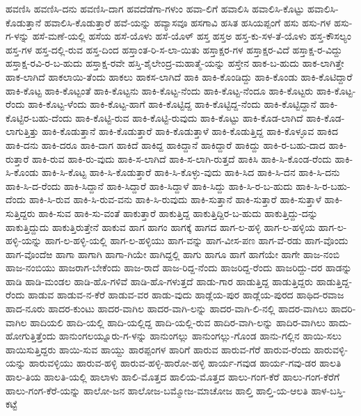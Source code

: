 ಹವಣಿಸಿ
ಹವಣಿಸಿ-ದನು
ಹವಣಿಸಿ-ದಾಗ
ಹವದೆಡೆಗಾ-ಗಳುಂ
ಹವಾ-ಲಿಗೆ
ಹವಾಲಿಸಿ
ಹವಾಲಿಸಿ-ಕೊಟ್ಟು
ಹವಾಲಿಸಿ-ಕೊಡುತ್ತಾನೆ
ಹವಾಲಿಸಿ-ಕೊಡುತ್ತಾರೆ
ಹವೆ-ಯನ್ನು
ಹವ್ಯಾಸವೂ
ಹಸಗಾವಿ
ಹಸಿತ
ಹಸಿಯಪ್ಪಂಗೆ
ಹಸು
ಹಸು-ಗಳ
ಹಸು-ಗ-ಳನ್ನು
ಹಸೆ-ಮಣೆ-ಯಲ್ಲಿ
ಹಸೆಯ
ಹಸೆ-ಯೊಳು
ಹಸೆ-ಯೊಳ್
ಹಸ್ತ
ಹಸ್ತಅ
ಹಸ್ತ-ಕು-ಸಳ-ತೆ-ಯೊಳು
ಹಸ್ತ-ಕೌಸಲ್ಯಂ
ಹಸ್ತ-ಗಳ
ಹಸ್ತ-ದಲ್ಲಿ-ರುವ
ಹಸ್ತ-ದಿಂದ
ಹಸ್ತಾಂತ-ರಿ-ಸ-ಲಾ-ಯಿತು
ಹಸ್ತಾಕ್ಷರ-ಗಳ
ಹಸ್ತಾಕ್ಷರ-ವಿದೆ
ಹಸ್ತಾಕ್ಷ-ರ-ವಿದ್ದು
ಹಸ್ತಾಕ್ಷ-ರವಿ-ರ-ಬ-ಹುದು
ಹಸ್ತಾಕ್ಷ-ರವೇ
ಹಸ್ತಿ-ಶೈಲೇಂದ್ರ-ಮಹಾತ್ಮೆ-ಯನ್ನು
ಹಸ್ತೇನ
ಹಾಕ-ಬ-ಹುದು
ಹಾಕ-ಲಾಗಿತ್ತೇ
ಹಾಕ-ಲಾಗಿದೆ
ಹಾಕಲಾಯಿ-ತೆಂದು
ಹಾಕಲು
ಹಾಕಸ-ಲಾಗಿದೆ
ಹಾಕಿ
ಹಾಕಿ-ಕೊಂಡಿದ್ದು
ಹಾಕಿ-ಕೊಂಡು
ಹಾಕಿ-ಕೊಟಿದ್ದಾರೆ
ಹಾಕಿ-ಕೊಟ್ಟ
ಹಾಕಿ-ಕೊಟ್ಟಂತೆ
ಹಾಕಿ-ಕೊಟ್ಟನು
ಹಾಕಿ-ಕೊಟ್ಟ-ನೆಂದು
ಹಾಕಿ-ಕೊಟ್ಟ-ನೆಂದೂ
ಹಾಕಿ-ಕೊಟ್ಟರು
ಹಾಕಿ-ಕೊಟ್ಟ-ರೆಂದು
ಹಾಕಿ-ಕೊಟ್ಟ-ಳೆಂದು
ಹಾಕಿ-ಕೊಟ್ಟ-ಹಾಗೆ
ಹಾಕಿ-ಕೊಟ್ಟಿದ್ದ
ಹಾಕಿ-ಕೊಟ್ಟಿದ್ದ-ನೆಂದು
ಹಾಕಿ-ಕೊಟ್ಟಿದ್ದಾನೆ
ಹಾಕಿ-ಕೊಟ್ಟಿರ-ಬಹು-ದೆಂದು
ಹಾಕಿ-ಕೊಟ್ಟಿ-ರುವ
ಹಾಕಿ-ಕೊಟ್ಟಿ-ರುವುದು
ಹಾಕಿ-ಕೊಟ್ಟು
ಹಾಕಿ-ಕೊಡ-ಲಾಗಿದೆ
ಹಾಕಿ-ಕೊಡ-ಲಾಗುತ್ತಿತ್ತು
ಹಾಕಿ-ಕೊಡುತ್ತಾನೆ
ಹಾಕಿ-ಕೊಡುತ್ತಾರೆ
ಹಾಕಿ-ಕೊಡುತ್ತಾಳೆ
ಹಾಕಿ-ಕೊಡುತ್ತಿದ್ದ
ಹಾಕಿ-ಕೊಳ್ಳೂವ
ಹಾಕಿದ
ಹಾಕಿ-ದನು
ಹಾಕಿ-ದರೂ
ಹಾಕಿ-ದಾಗ
ಹಾಕಿದೆ
ಹಾಕಿದ್ದ
ಹಾಕಿದ್ದಾನೆ
ಹಾಕಿದ್ದಾರೆ
ಹಾಕಿದ್ದು
ಹಾಕಿ-ರ-ಬಹು-ದಾದ
ಹಾಕಿ-ರುತ್ತಾರೆ
ಹಾಕಿ-ರುವ
ಹಾಕಿ-ರು-ವುದು
ಹಾಕಿ-ಸ-ಲಾಗಿದೆ
ಹಾಕಿ-ಸ-ಲಾಗಿ-ರುತ್ತದೆ
ಹಾಕಿಸಿ
ಹಾಕಿ-ಸಿ-ಕೊಂಡ-ರೆಂದು
ಹಾಕಿ-ಸಿ-ಕೊಂಡು
ಹಾಕಿ-ಸಿ-ಕೊಟ್ಟ
ಹಾಕಿ-ಸಿ-ಕೊಡುತ್ತಾರೆ
ಹಾಕಿ-ಸಿ-ಕೊಳ್ಳು-ವುದು
ಹಾಕಿ-ಸಿದ
ಹಾಕಿ-ಸಿ-ದನ
ಹಾಕಿ-ಸಿ-ದನು
ಹಾಕಿ-ಸಿ-ದ-ರೆಂದು
ಹಾಕಿ-ಸಿದ್ದಾನೆ
ಹಾಕಿ-ಸಿದ್ದಾರೆ
ಹಾಕಿ-ಸಿದ್ದಾಳೆ
ಹಾಕಿ-ಸಿದ್ದು
ಹಾಕಿ-ಸಿ-ರ-ಬ-ಹುದು
ಹಾಕಿ-ಸಿ-ರ-ಬಹು-ದೆಂದು
ಹಾಕಿ-ಸಿ-ರುವ
ಹಾಕಿ-ಸಿ-ರುವ-ವನು
ಹಾಕಿ-ಸಿ-ರುವುದು
ಹಾಕಿ-ಸುತ್ತಾನೆ
ಹಾಕಿ-ಸುತ್ತಾರೆ
ಹಾಕಿ-ಸುತ್ತಾಳೆ
ಹಾಕಿ-ಸುತ್ತಿದ್ದರು
ಹಾಕಿ-ಸುವ
ಹಾಕಿ-ಸು-ವಂತೆ
ಹಾಕುತ್ತಾರೆ
ಹಾಕುತ್ತಿದ್ದ
ಹಾಕುತ್ತಿದ್ದಿರ-ಬ-ಹುದು
ಹಾಕುತ್ತಿದ್ದು-ದನ್ನು
ಹಾಕುತ್ತಿದ್ದುದು
ಹಾಕುತ್ತಿರುತ್ತೇನೆ
ಹಾಕುವ
ಹಾಗ
ಹಾಗಂ
ಹಾಗಕ್ಕೆ
ಹಾಗದ
ಹಾಗ-ಲ-ಹಳ್ಳಿ
ಹಾಗ-ಲ-ಹಳ್ಳಿಯ
ಹಾಗ-ಲ-ಹಳ್ಳಿ-ಯನ್ನು
ಹಾಗ-ಲ-ಹಳ್ಳಿ-ಯಲ್ಲಿ
ಹಾಗ-ಲ-ಹಳ್ಳಿಯು
ಹಾಗ-ವನ್ನು
ಹಾಗ-ವೀಸ-ಪಣ
ಹಾಗ-ವೆ-ರಡು
ಹಾಗ-ವೊಂದು
ಹಾಗ-ವೊಂದೆಱ
ಹಾಗಾ
ಹಾಗಾಗಿ
ಹಾಗಾ-ಗಿಯೇ
ಹಾಗಿದ್ದಲ್ಲಿ
ಹಾಗು
ಹಾಗೂ
ಹಾಗೆ
ಹಾಗೆಯೇ
ಹಾಗೇ
ಹಾಜ-ನಂಬಿ
ಹಾಜ-ನಂಬಿಯು
ಹಾಜರಾಗ-ಬೇಕೆಂದು
ಹಾಜ-ರಾದೆ
ಹಾಜ-ರಿದ್ದ-ನೆಂದು
ಹಾಜರಿದ್ದ-ರೆಂದು
ಹಾಜರಿದ್ದು-ದರ
ಹಾಡನ್ನು
ಹಾಡಿ
ಹಾಡಿ-ಮಂಡಲ
ಹಾಡಿ-ಹೊ-ಗಳಿವೆ
ಹಾಡಿ-ಹೊ-ಗಳುತ್ತದೆ
ಹಾಡು-ಗಾರ
ಹಾಡುತ್ತಿದ್ದ
ಹಾಡುತ್ತಿದ್ದರು
ಹಾಡುತ್ತಿದ್ದ-ರೆಂದು
ಹಾಡುವ
ಹಾಡುವ-ನ-ಕೆರೆ
ಹಾಡುವ-ವರ
ಹಾಡು-ವುದು
ಹಾಡ್ಲೆಯ-ಪುರ
ಹಾಡ್ಲೆಯ-ಪುರದ
ಹಾಥಿದ-ರವಾಜ
ಹಾದ-ನೂರು
ಹಾದರ-ಕುಂಟು
ಹಾದರ-ವಾಗಿಲ
ಹಾದರ-ವಾಗಿ-ಲನ್ನು
ಹಾದರ-ವಾಗಿ-ಲಿ-ನಲ್ಲಿ
ಹಾದರ-ವಾಗಿಲು
ಹಾದರಿ-ವಾಗಿಲ
ಹಾದಿಯಲಿ
ಹಾದಿ-ಯಲ್ಲಿ
ಹಾದಿ-ಯಲ್ಲಿದ್ದ
ಹಾದಿ-ಯಲ್ಲಿ-ರುವ
ಹಾದಿರ-ವಾಗಿ-ಲನ್ನು
ಹಾದಿರ-ವಾಗಿಲು
ಹಾದು-ಹೋಗುತ್ತಿತ್ತೆಂದು
ಹಾನುಂಗಲಯ್ನೂರು-ಗ-ಳನ್ನು
ಹಾನುಂಗಲ್ಲು
ಹಾನುಂಗಲ್ಲು-ಗೊಂಡ
ಹಾನು-ಗಲ್ಲಿನ
ಹಾಯಿ-ಸಲು
ಹಾಯಿಸುತ್ತಿದ್ದರು
ಹಾಯಿ-ಸುವ
ಹಾಯ್ದು
ಹಾರಪ್ಪಂಗಳ
ಹಾರಿಗೆ
ಹಾರುವ
ಹಾರುವ-ಗೆರೆ
ಹಾರುವ-ರೆಂದು
ಹಾರುವಳ್ಳಿ-ಯನ್ನು
ಹಾರುವಳ್ಳಿಯು
ಹಾರುವ-ಹಳ್ಳಿ
ಹಾರುವ-ಹಳ್ಳಿ-ಹಾರೋ-ಹಳ್ಳಿ
ಹಾರ್ಯ-ಗವುಡ
ಹಾರ್ಯ-ಗವು-ಡರ
ಹಾಲತಿ
ಹಾಲ-ತಿಯ
ಹಾಲತಿ-ಯಲ್ಲಿ
ಹಾಲಾಳು
ಹಾಲಿ-ಮೊತ್ತದ
ಹಾಲಿಯ-ಮೊತ್ತದ
ಹಾಲು-ಗಂಗ-ಕೆರೆ
ಹಾಲು-ಗಂಗ-ಕೆರೆಗೆ
ಹಾಲು-ಗಂಗ-ಕೆರೆ-ಯನ್ನು
ಹಾಲೋ-ಜನ
ಹಾಲೋಜ-ಬಮ್ಮೋಜ-ಮಾಚೋಜ
ಹಾಲ್ತಿ
ಹಾಲ್ತಿ-ಯ-ಆಲತಿ
ಹಾಳ-ಬಸ್ತಿ-ಕಟ್ಟೆ
